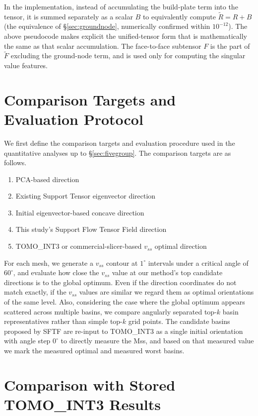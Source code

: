\documentclass[11pt,a4paper]{article}
\begin{document}
In the implementation, instead of accumulating the build-plate term into the tensor, it is summed separately as a scalar $B$
to equivalently compute $\tilde R=R+B$ (the equivalence of \S\ref{sec:groundnode}, numerically confirmed within $10^{-12}$).
The above pseudocode makes explicit the unified-tensor form that is mathematically the same as that scalar accumulation.
The face-to-face subtensor $F$ is the part of $\tilde F$ excluding the ground-node term, and is used only for computing the singular value features.

\section{Comparison Targets and Evaluation Protocol}
\label{sec:protocol}

We first define the comparison targets and evaluation procedure used in the quantitative analyses up to \S\ref{sec:fivegroup}.
The comparison targets are as follows.

\begin{enumerate}
\item PCA-based direction
\item Existing Support Tensor eigenvector direction
\item Initial eigenvector-based concave direction
\item This study's Support Flow Tensor Field direction
\item TOMO\_INT3 or commercial-slicer-based $v_{ss}$ optimal direction
\end{enumerate}

For each mesh, we generate a $v_{ss}$ contour at $1^\circ$ intervals under a critical angle of $60^\circ$,
and evaluate how close the $v_{ss}$ value at our method's top candidate directions is to the global optimum.
Even if the direction coordinates do not match exactly, if the $v_{ss}$ values are similar we regard them as optimal orientations of the same level.
Also, considering the case where the global optimum appears scattered across multiple basins,
we compare angularly separated top-$k$ basin representatives rather than simple top-$k$ grid points.
The candidate basins proposed by SFTF are re-input to TOMO\_INT3 as a single initial orientation with angle step $0^\circ$
to directly measure the Mss,
and based on that measured value we mark the measured optimal and measured worst basins.

\section{Comparison with Stored TOMO\_INT3 Results}
\end{document}
